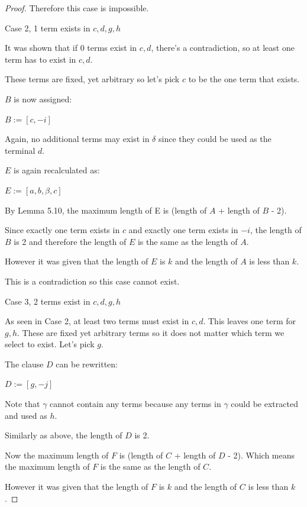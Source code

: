 \documentclass[manuscript]{acmart}
\begin{document}
\begin{proof}
        Therefore this case is impossible.

        Case 2, 1 term exists in {$c, d, g, h$}

        It was shown that if 0 terms exist in {$c, d$}, there's a contradiction, 
        so at least one term has to exist in {$c, d$}.

        These terms are fixed, yet arbitrary so let's pick $c$ to be the one term that exists.

        $B$ is now assigned:

        $B := [c, -i]$

        Again, no additional terms may exist in $\delta$ since they could
        be used as the terminal $d$.

        $E$ is again recalculated as:

        $E := [a, b, \beta, c]$

        By Lemma 5.10, the maximum length of E is 
        (length of $A$ + length of $B$ - 2).

        Since exactly one term exists in $c$ and exactly one term exists in $-i$,
        the length of $B$ is 2 and therefore the length of $E$ is the same
        as the length of $A$.

        However it was given that the length of $E$ is $k$ and the length of 
        $A$ is less than $k$.

        This is a contradiction so this case cannot exist.

        Case 3, 2 terms exist in {$c, d, g, h$}

        As seen in Case 2, at least two terms must exist in {$c, d$}. This
        leaves one term for {$g, h$}. These are fixed yet arbitrary terms
        so it does not matter which term we select to exist. Let's pick
        $g$.

        The clause $D$ can be rewritten:

        $D := [g, -j]$

        Note that $\gamma$ cannot contain any terms because any terms in
        $\gamma$ could be extracted and used as $h$.

        Similarly as above, the length of $D$ is 2.

        Now the maximum length of $F$ is (length of $C$ + length of $D$ - 2).
        Which means the maximum length of $F$ is the same as the length of $C$.

        However it was given that the length of $F$ is $k$ and the length
        of $C$ is less than $k$.


\end{proof}
\end{document}
